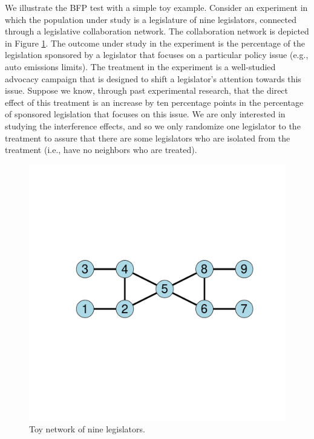 \documentclass[12pt]{article}
\begin{document}
We illustrate the BFP test with a simple toy example. Consider an experiment in which the population under study is a legislature of nine legislators, connected through a legislative collaboration network. The collaboration network is depicted in Figure \ref{fig:ninenet}. The outcome under study in the experiment is the percentage of the legislation sponsored by a legislator that focuses on a particular policy issue (e.g., auto emissions limits). The treatment in the experiment is a well-studied advocacy campaign that is designed to shift a legislator's attention towards this issue. Suppose we know, through past experimental research, that the direct effect of this treatment is an increase by ten percentage points in the percentage of sponsored legislation that focuses on this issue. We are only interested in studying the interference effects, and so we only randomize one legislator to the treatment to assure that there are some legislators who are isolated from the treatment (i.e., have no neighbors who are treated). 

\begin{figure}[htp]
\includegraphics[scale=.5,clip=true,trim = 2cm 6cm 2cm 6cm]{./images/BFPIllustration}
\caption{Toy network of nine legislators.}
\label{fig:ninenet}
\end{figure}
\end{document}
